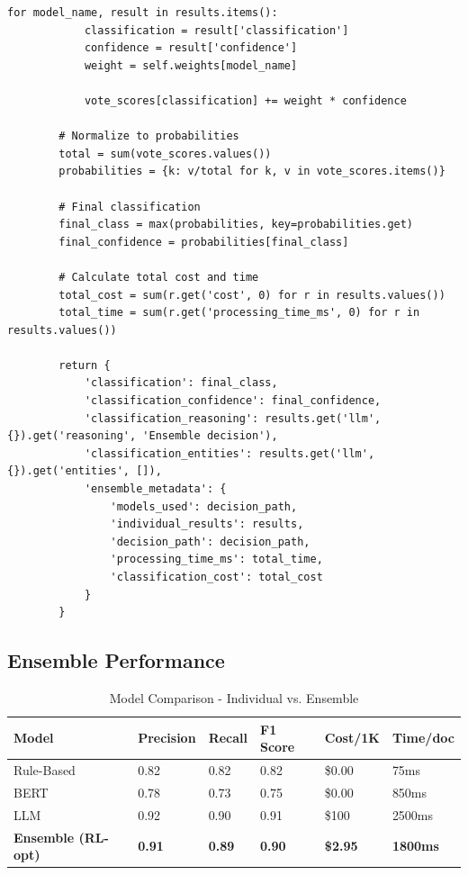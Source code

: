 \begin{lstlisting}[style=pythonstyle]
        for model_name, result in results.items():
            classification = result['classification']
            confidence = result['confidence']
            weight = self.weights[model_name]
            
            vote_scores[classification] += weight * confidence
        
        # Normalize to probabilities
        total = sum(vote_scores.values())
        probabilities = {k: v/total for k, v in vote_scores.items()}
        
        # Final classification
        final_class = max(probabilities, key=probabilities.get)
        final_confidence = probabilities[final_class]
        
        # Calculate total cost and time
        total_cost = sum(r.get('cost', 0) for r in results.values())
        total_time = sum(r.get('processing_time_ms', 0) for r in results.values())
        
        return {
            'classification': final_class,
            'classification_confidence': final_confidence,
            'classification_reasoning': results.get('llm', {}).get('reasoning', 'Ensemble decision'),
            'classification_entities': results.get('llm', {}).get('entities', []),
            'ensemble_metadata': {
                'models_used': decision_path,
                'individual_results': results,
                'decision_path': decision_path,
                'processing_time_ms': total_time,
                'classification_cost': total_cost
            }
        }
\end{lstlisting}

\subsection{Ensemble Performance}

\begin{table}[h]
\centering
\caption{Model Comparison - Individual vs. Ensemble}
\begin{tabularx}{\textwidth}{lXXXXX}
\toprule
\textbf{Model} & \textbf{Precision} & \textbf{Recall} & \textbf{F1 Score} & \textbf{Cost/1K} & \textbf{Time/doc} \\
\midrule
Rule-Based & 0.82 & 0.82 & 0.82 & \$0.00 & 75ms \\
BERT & 0.78 & 0.73 & 0.75 & \$0.00 & 850ms \\
LLM & 0.92 & 0.90 & 0.91 & \$100 & 2500ms \\
\textbf{Ensemble (RL-opt)} & \textbf{0.91} & \textbf{0.89} & \textbf{0.90} & \textbf{\$2.95} & \textbf{1800ms} \\
\bottomrule
\end{tabularx}
\end{table}

